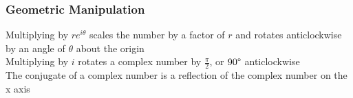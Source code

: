 \documentclass[../main]{subfiles}
\begin{document}
	\subsubsection{Geometric Manipulation}
	Multiplying by \(re^{i\theta}\) scales the number by a factor of \(r\) and rotates anticlockwise by an angle of \(\theta\) about the origin \\
	Multiplying by \(i\) rotates a complex number by \(\frac{\pi}{2}\), or \(90\degree\) anticlockwise \\
	The conjugate of a complex number is a reflection of the complex number on the x axis
\end{document}

